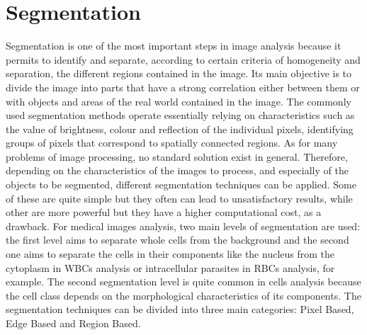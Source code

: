 \documentclass[final,a4paper,12pt,english]{UnicaPhdThesis3}
\begin{document}
	\chapter{Segmentation} %
	Segmentation is one of the most important steps in image analysis because it permits to identify and separate, according to certain criteria of homogeneity and separation, the different regions contained in the image. Its main objective is to divide the image into parts that have a strong correlation either between them or with objects and areas of the real world contained in the image. The commonly used segmentation methods operate essentially relying on characteristics such as the value of brightness, colour and reflection of the individual pixels, identifying groups of pixels that correspond to spatially connected regions. 
	As for many problems of image processing, no standard solution exist in general. Therefore, depending on the characteristics of the images to process, and especially of the objects to be segmented, different segmentation techniques can be applied. Some of these are quite simple but they often can lead to unsatisfactory results, while other are more powerful but they have a higher computational cost, as a drawback. For medical images analysis, two main levels of segmentation are used: the first level aims to separate whole cells from the background and the second one aims to separate the cells in their components like the nucleus from the cytoplasm in WBCs analysis or intracellular parasites in RBCs analysis, for example. The second segmentation level is quite common in cells analysis because the cell class depends on the morphological characteristics of its components. The segmentation techniques can be divided into three main categories: Pixel Based, Edge Based and Region Based.
	
\end{document}
